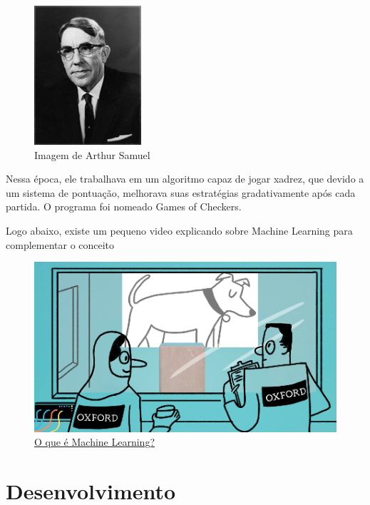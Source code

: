 \documentclass{article}
\begin{document}
    \begin{figure}[htp]
        \centering
        \includegraphics[scale=1]{ArthurSamuel.jpg}
        \caption{Imagem de Arthur Samuel}
    \end{figure}

    Nessa época, ele trabalhava em um algoritmo capaz de jogar xadrez, que devido a um sistema de
    pontuação, melhorava suas estratégias gradativamente após cada partida. O programa foi nomeado
    Games of Checkers.

    Logo abaixo, existe um pequeno video explicando sobre Machine Learning para complementar o conceito

    \begin{figure}[htp]
        \centering
        \includegraphics[scale=0.65]{ML.png}
        \caption{\href{https://youtu.be/pbVwH8o837A}{O que é Machine Learning?}}
    \end{figure}

    \newpage
    \section{Desenvolvimento} \label{sec:desenvolvimento}
\end{document}
